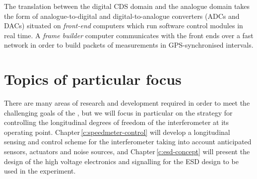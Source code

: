 The translation between the digital \gls{CDS} domain and the analogue domain takes the form of analogue-to-digital and digital-to-analogue converters (\glspl{ADC} and \glspl{DAC}) situated on \emph{front-end} computers which run software control modules in real time. A \emph{frame builder} computer communicates with the front ends over a fast network in order to build packets of measurements in \gls{GPS}-synchronised intervals.

\section{Topics of particular focus}
There are many areas of research and development required in order to meet the challenging goals of the \SSMEXPT{}, but we will focus in particular on the strategy for controlling the longitudinal degrees of freedom of the interferometer at its operating point. Chapter\,\ref{c:speedmeter-control} will develop a longitudinal sensing and control scheme for the interferometer taking into account anticipated sensors, actuators and noise sources, and Chapter\,\ref{c:esd-concept} will present the design of the high voltage electronics and signalling for the \gls{ESD} design to be used in the experiment.
